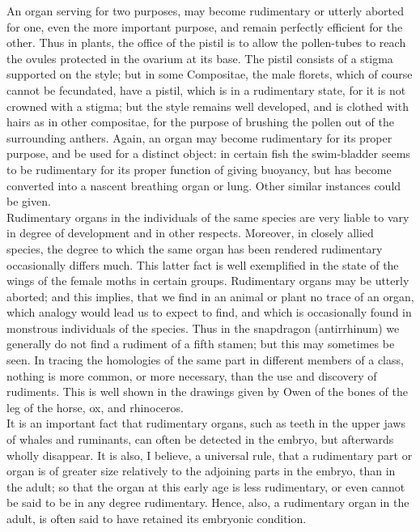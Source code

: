 \indent An organ serving for two purposes, may become rudimentary or utterly aborted for one, even the more important purpose, and remain perfectly efficient for the other. Thus in plants, the office of the pistil is to allow the pollen-tubes to reach the ovules protected in the ovarium at its base. The pistil consists of a stigma supported on the style; but in some Compositae, the male florets, which of course cannot be fecundated, have a pistil, which is in a rudimentary state, for it is not crowned with a stigma; but the style remains well developed, and is clothed with hairs as in other compositae, for the purpose of brushing the pollen out of the surrounding anthers. Again, an organ may become rudimentary for its proper purpose, and be used for a distinct object: in certain fish the swim-bladder seems to be rudimentary for its proper function of giving buoyancy, but has become converted into a nascent breathing organ or lung. Other similar instances could be given.~\\
\indent Rudimentary organs in the individuals of the same species are very liable to vary in degree of development and in other respects. Moreover, in closely allied species, the degree to which the same organ has been rendered rudimentary occasionally differs much. This latter fact is well exemplified in the state of the wings of the female moths in certain groups. Rudimentary organs may be utterly aborted; and this implies, that we find in an animal or plant no trace of an organ, which analogy would lead us to expect to find, and which is occasionally found in monstrous individuals of the species. Thus in the snapdragon (antirrhinum) we generally do not find a rudiment of a fifth stamen; but this may sometimes be seen. In tracing the homologies of the same part in different members of a class, nothing is more common, or more necessary, than the use and discovery of rudiments. This is well shown in the drawings given by Owen of the bones of the leg of the horse, ox, and rhinoceros.~\\
\indent It is an important fact that rudimentary organs, such as teeth in the upper jaws of whales and ruminants, can often be detected in the embryo, but afterwards wholly disappear. It is also, I believe, a universal rule, that a rudimentary part or organ is of greater size relatively to the adjoining parts in the embryo, than in the adult; so that the organ at this early age is less rudimentary, or even cannot be said to be in any degree rudimentary. Hence, also, a rudimentary organ in the adult, is often said to have retained its embryonic condition.~\\
